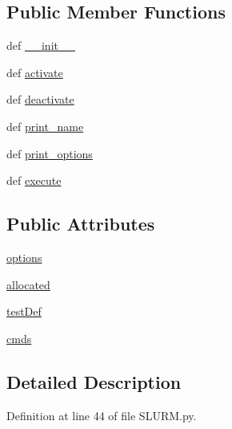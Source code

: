 \subsection*{Public Member Functions}
\begin{DoxyCompactItemize}
\item 
def \hyperlink{class_s_l_u_r_m_1_1_s_l_u_r_m_aa985bacce290322ef03060d671e705a1}{\-\_\-\-\_\-init\-\_\-\-\_\-}
\item 
def \hyperlink{class_s_l_u_r_m_1_1_s_l_u_r_m_a7b3b5d04275a853d623f6fff36b76e7e}{activate}
\item 
def \hyperlink{class_s_l_u_r_m_1_1_s_l_u_r_m_a4622d35bba26ef97a305e9d057e5db6c}{deactivate}
\item 
def \hyperlink{class_s_l_u_r_m_1_1_s_l_u_r_m_a79a9d29418a1a20a9d502c0723c3e8e7}{print\-\_\-name}
\item 
def \hyperlink{class_s_l_u_r_m_1_1_s_l_u_r_m_ad735f2669f29aca338d4dc61b6423284}{print\-\_\-options}
\item 
def \hyperlink{class_s_l_u_r_m_1_1_s_l_u_r_m_ab53b5b6093e23284f0f8494fc2be2263}{execute}
\end{DoxyCompactItemize}
\subsection*{Public Attributes}
\begin{DoxyCompactItemize}
\item 
\hyperlink{class_s_l_u_r_m_1_1_s_l_u_r_m_a652a43986b8bda5c6ddb866ab0513ac8}{options}
\item 
\hyperlink{class_s_l_u_r_m_1_1_s_l_u_r_m_aee4130d6ff2007d08fad045aedd69781}{allocated}
\item 
\hyperlink{class_s_l_u_r_m_1_1_s_l_u_r_m_a9b08ef79e039a8524f1fa6712b45182b}{test\-Def}
\item 
\hyperlink{class_s_l_u_r_m_1_1_s_l_u_r_m_ab755a940fd09c8fa416c177f692d31d6}{cmds}
\end{DoxyCompactItemize}


\subsection{Detailed Description}


Definition at line 44 of file S\-L\-U\-R\-M.\-py.



